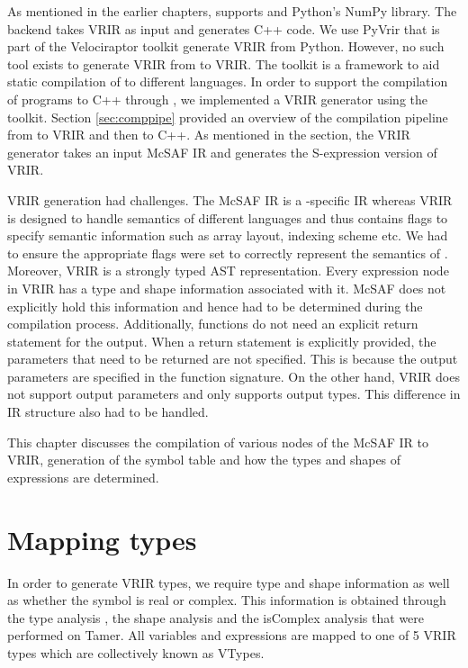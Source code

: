As mentioned in the earlier chapters, \velocty supports \matlab and Python's NumPy library. The \velocty backend takes VRIR as input and generates C++ code. We use PyVrir that is part of the Velociraptor toolkit generate VRIR from Python. However, no such tool exists to generate VRIR from \matlab to VRIR. The \mclab toolkit is a framework to aid static compilation of \matlab to different languages. In order to support the compilation of \matlab programs to C++ through \velocty, we implemented a VRIR generator using the \mclab toolkit. Section \ref{sec:comppipe} provided an overview of the compilation pipeline from \matlab to VRIR and then to C++. As mentioned in the section, the VRIR generator takes an input McSAF IR and generates the S-expression version of VRIR.

VRIR generation had challenges. The McSAF IR is a \matlab-specific IR whereas VRIR is designed to handle semantics of different languages and thus contains flags to specify semantic information such as array layout, indexing scheme etc. We had to ensure the appropriate flags were set to correctly represent the semantics of \matlab. Moreover, VRIR is a strongly typed AST representation. Every expression node in VRIR has a type and shape information associated with it. McSAF does not explicitly hold this information and hence had to be determined during the compilation process. Additionally, \matlab functions do not need an explicit return statement for the output. When a return statement is explicitly provided, the parameters that need to be returned are not specified. This is because the output parameters are specified in the function signature. On the other hand, VRIR does not support output parameters and only supports output types. This difference in IR structure also had to be handled.

This chapter discusses the compilation of various nodes of the McSAF IR to VRIR, generation of the symbol table and how the types and shapes of expressions are determined.
\section{Mapping types}
In order to generate VRIR types, we require type and shape information as well as whether the symbol is real or complex. This information is obtained through the type analysis , the shape analysis and the isComplex analysis that were performed on Tamer. All variables and expressions are mapped to one of 5 VRIR types which are collectively known as VTypes.


